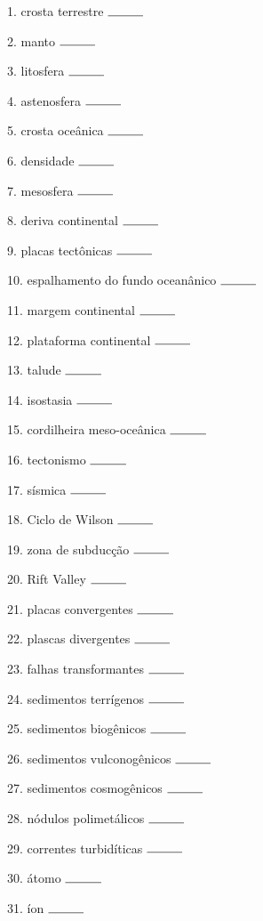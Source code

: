 \documentclass[a4paper,10pt]{article}
\begin{document}
\begin{multicols}{2}
 
1. crosta terrestre $\rule{1cm}{0.15mm}$

2. manto $\rule{1cm}{0.15mm}$

3. litosfera $\rule{1cm}{0.15mm}$

4. astenosfera $\rule{1cm}{0.15mm}$

5. crosta oceânica $\rule{1cm}{0.15mm}$

6. densidade $\rule{1cm}{0.15mm}$

7. mesosfera $\rule{1cm}{0.15mm}$

8. deriva continental $\rule{1cm}{0.15mm}$

9. placas tectônicas $\rule{1cm}{0.15mm}$

10. espalhamento do fundo oceanânico $\rule{1cm}{0.15mm}$

11. margem continental $\rule{1cm}{0.15mm}$

12. plataforma continental $\rule{1cm}{0.15mm}$

13. talude $\rule{1cm}{0.15mm}$

14. isostasia $\rule{1cm}{0.15mm}$

15. cordilheira meso-oceânica $\rule{1cm}{0.15mm}$

16. tectonismo $\rule{1cm}{0.15mm}$

17. sísmica $\rule{1cm}{0.15mm}$

18. Ciclo de Wilson $\rule{1cm}{0.15mm}$

19. zona de subducção $\rule{1cm}{0.15mm}$

20. Rift Valley $\rule{1cm}{0.15mm}$

21. placas convergentes $\rule{1cm}{0.15mm}$

22. plascas divergentes $\rule{1cm}{0.15mm}$

23. falhas transformantes $\rule{1cm}{0.15mm}$

24. sedimentos terrígenos $\rule{1cm}{0.15mm}$

25. sedimentos biogênicos $\rule{1cm}{0.15mm}$

26. sedimentos vulconogênicos $\rule{1cm}{0.15mm}$

27. sedimentos cosmogênicos $\rule{1cm}{0.15mm}$

28. nódulos polimetálicos $\rule{1cm}{0.15mm}$

29. correntes turbidíticas $\rule{1cm}{0.15mm}$

30. átomo $\rule{1cm}{0.15mm}$

31. íon $\rule{1cm}{0.15mm}$


\end{multicols}
\end{document}
